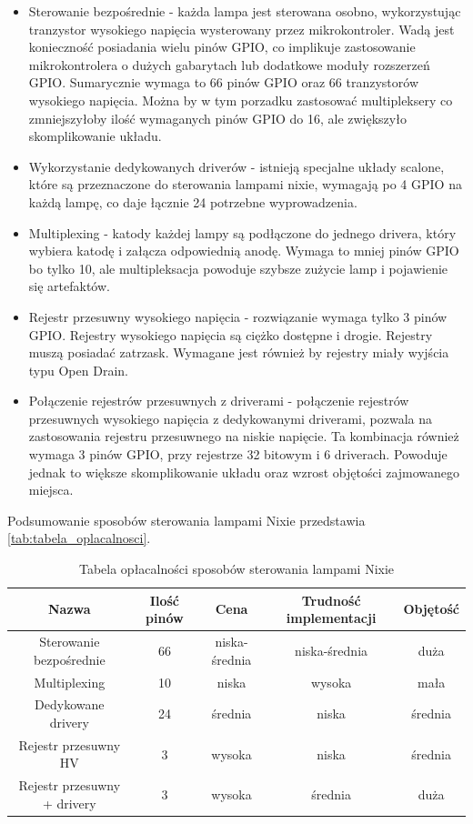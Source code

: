 \documentclass[../main.tex]{subfiles}
\begin{document}
\begin{itemize}
    \item Sterowanie bezpośrednie - każda lampa jest sterowana osobno, wykorzystując tranzystor wysokiego napięcia wysterowany przez mikrokontroler.
    Wadą jest konieczność posiadania wielu pinów GPIO, co implikuje zastosowanie mikrokontrolera o dużych gabarytach lub dodatkowe moduły rozszerzeń GPIO. Sumarycznie wymaga to 66 pinów GPIO oraz 66 tranzystorów wysokiego napięcia.
    Można by w tym porzadku zastosować multipleksery co zmniejszyłoby ilość wymaganych pinów GPIO do 16, ale zwiększyło skomplikowanie układu.
    \item Wykorzystanie dedykowanych driverów - istnieją specjalne układy scalone, które są przeznaczone do sterowania lampami nixie,
    wymagają po 4 GPIO na każdą lampę, co daje łącznie 24 potrzebne wyprowadzenia.
    \item Multiplexing - katody każdej lampy są podłączone do jednego drivera, który wybiera katodę i załącza odpowiednią anodę. 
    Wymaga to mniej pinów GPIO bo tylko 10, ale multipleksacja powoduje szybsze zużycie lamp i pojawienie się artefaktów.
    \item Rejestr przesuwny wysokiego napięcia - rozwiązanie wymaga tylko 3 pinów GPIO. Rejestry wysokiego napięcia są ciężko dostępne i drogie.
    Rejestry muszą posiadać zatrzask. Wymagane jest również by rejestry miały wyjścia typu Open Drain.
    \item Połączenie rejestrów przesuwnych z driverami - połączenie rejestrów przesuwnych wysokiego napięcia z dedykowanymi driverami, pozwala na zastosowania
    rejestru przesuwnego na niskie napięcie. Ta kombinacja również wymaga 3 pinów GPIO, przy rejestrze 32 bitowym i 6 driverach. Powoduje jednak to
    większe skomplikowanie układu oraz wzrost objętości zajmowanego miejsca.
\end{itemize}
Podsumowanie sposobów sterowania lampami Nixie przedstawia \ref{tab:tabela_oplacalnosci}.
\begin{table}[H]
  \centering
  \begin{tabular}{|c|c|c|c|c|}
    \hline
    Nazwa & Ilość pinów & Cena & Trudność implementacji & Objętość\\
    \hline
    Sterowanie bezpośrednie & 66 & niska-średnia & niska-średnia & duża \\
    \hline
    Multiplexing & 10 &niska & wysoka & mała \\
    \hline
    Dedykowane drivery & 24 &średnia & niska & średnia \\
    \hline
    Rejestr przesuwny HV & 3 &wysoka & niska & średnia \\
    \hline
    Rejestr przesuwny + drivery & 3 & wysoka & średnia & duża \\
    \hline
  \end{tabular}
  \caption{Tabela opłacalności sposobów sterowania lampami Nixie}
\end{table}
\end{document}
